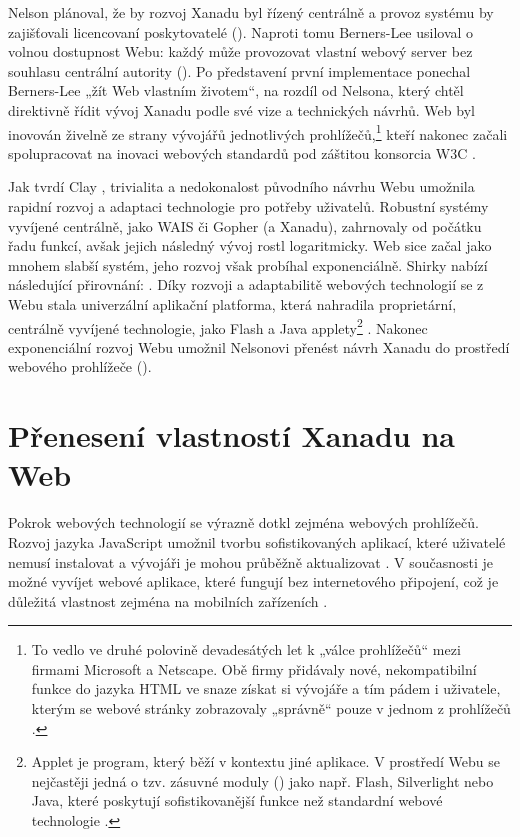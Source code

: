 Nelson plánoval, že by rozvoj Xanadu byl řízený centrálně a provoz systému by zajišťovali licencovaní poskytovatelé (). Naproti tomu Berners-Lee usiloval o volnou dostupnost Webu: každý může provozovat vlastní webový server bez souhlasu centrální autority (). Po představení první implementace ponechal Berners-Lee „žít Web vlastním životem“, na rozdíl od Nelsona, který chtěl direktivně řídit vývoj Xanadu podle své vize a technických návrhů. Web byl inovován živelně ze strany vývojářů jednotlivých prohlížečů,\footnote{To vedlo ve druhé polovině devadesátých let k „válce prohlížečů“ mezi firmami Microsoft a Netscape. Obě firmy přidávaly nové, nekompatibilní funkce do jazyka HTML ve snaze získat si vývojáře a tím pádem i uživatele, kterým se webové stránky zobrazovaly „správně“ pouze v jednom z prohlížečů \autocite[více viz][]{Hoffmann2017}.}
kteří nakonec začali spolupracovat na inovaci webových standardů pod záštitou konsorcia W3C \autocite{W3C:WebHistory}.

Jak tvrdí Clay \textcite{Shirky1998}, trivialita a nedokonalost původního návrhu Webu umožnila rapidní rozvoj a adaptaci technologie pro potřeby uživatelů. Robustní systémy vyvíjené centrálně, jako WAIS či Gopher (a Xanadu), zahrnovaly od počátku řadu funkcí, avšak jejich následný vývoj rostl logaritmicky. Web sice začal jako mnohem slabší systém, jeho rozvoj však probíhal exponenciálně. Shirky nabízí následující přirovnání: . 
Díky rozvoji a adaptabilitě webových technologií se z Webu stala univerzální aplikační platforma, která nahradila proprietární, centrálně vyvíjené technologie, jako Flash a Java applety\footnote{Applet je program, který běží v kontextu jiné aplikace. V prostředí Webu se nejčastěji jedná o tzv. zásuvné moduly () jako např. Flash, Silverlight nebo Java, které poskytují sofistikovanější funkce než standardní webové technologie \autocite{wiki:Applet}.} \autocite{FlashDeath}.
Nakonec exponenciální rozvoj Webu umožnil Nelsonovi přenést návrh Xanadu do prostředí webového prohlížeče ().

\section{Přenesení vlastností Xanadu na Web}

Pokrok webových technologií se výrazně dotkl zejména webových prohlížečů. Rozvoj jazyka JavaScript umožnil tvorbu sofistikovaných aplikací, které uživatelé nemusí instalovat a vývojáři je mohou průběžně aktualizovat \autocite[7]{Web2.0}. V současnosti je možné vyvíjet webové aplikace, které fungují bez internetového připojení, což je důležitá vlastnost zejména na mobilních zařízeních \autocite[tzv. , viz][]{RussellPWA}. 


